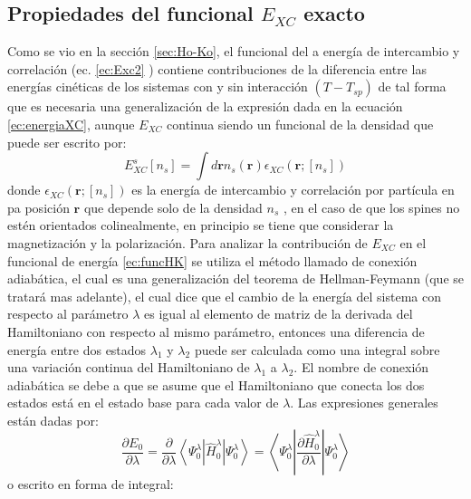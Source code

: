 \documentclass[12pt,a4paper, oneside]{book}
\begin{document}
   \subsection{Propiedades del funcional $E_{XC} $ exacto } \label{susec:exXC}
   Como se vio en la secci\'on \ref{sec:Ho-Ko}, el funcional del a energ\'ia de intercambio y correlaci\'on (ec. \ref{ec:Exc2} ) contiene contribuciones de la diferencia entre las energ\'ias cin\'eticas de los sistemas con y sin interacci\'on $(T-T_{sp})$ de tal forma que es necesaria una generalizaci\'on de la expresi\'on dada en la ecuaci\'on \ref{ec:energiaXC}, aunque $E_{XC}$ continua siendo un funcional de la densidad que puede ser escrito por:
   \begin{equation}
   E_{XC}^s [n_s] = \int d \pmb{r} n_s (\pmb{r}) \epsilon_{XC} (\pmb{r}; [n_s]) \label{ec:enGenXCf}
   \end{equation} 
   donde $ \epsilon_{XC} (\pmb{r}; [n_s])$ es la energ\'ia de intercambio y correlaci\'on por part\'icula en pa posici\'on $\pmb{r}$ que depende solo de la densidad $n_s$ , en el caso de que los spines no est\'en orientados colinealmente, en principio se tiene que considerar la magnetizaci\'on y la polarizaci\'on.
   \newline
   Para analizar la contribuci\'on de $E_{XC} $ en el funcional de energ\'ia \ref{ec:funcHK} se utiliza el m\'etodo llamado de conexi\'on adiab\'atica, el cual es una generalizaci\'on del teorema de Hellman-Feymann (que se tratar\'a mas adelante), el cual dice que el cambio de la energ\'ia del sistema con respecto al par\'ametro $\lambda$ es igual al elemento de matriz de la derivada del Hamiltoniano con respecto al mismo par\'ametro, entonces una diferencia de energ\'ia entre dos estados $\lambda_1$ y $\lambda_2$ puede ser calculada como una integral sobre una variaci\'on continua del Hamiltoniano de  $\lambda_1$ a $\lambda_2$. El nombre de conexi\'on adiab\'atica se debe a que se asume que el Hamiltoniano que conecta los dos estados est\'a en el estado base para cada valor de $\lambda$. Las expresiones generales est\'an dadas por:
   \begin{equation}
   \frac{\partial E_0}{\partial \lambda} = \frac{\partial}{\partial \lambda} \left \langle \Psi_0^{\lambda} \left | \hat{H}_0 ^{\lambda} \right |  \Psi_0^{\lambda} \right \rangle = \left \langle \Psi_0^{\lambda} \left | \frac{\partial \hat{H}_0 ^{\lambda}}{\partial \lambda} \right |  \Psi_0^{\lambda} \right \rangle \label{ec:adAproxderivada}
   \end{equation}  
   o escrito en forma de integral:
\end{document}
